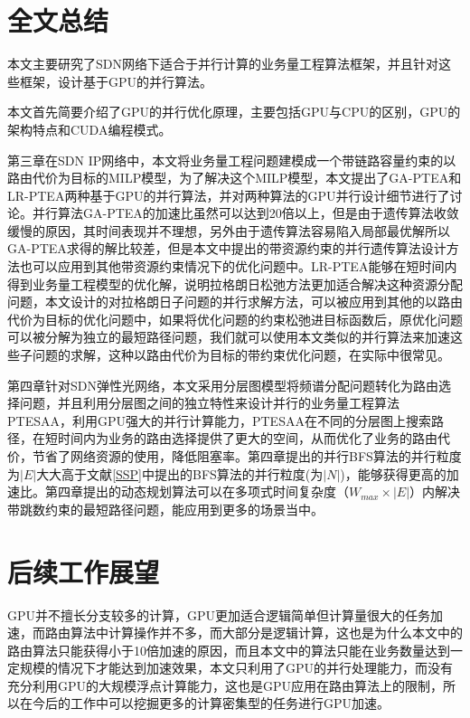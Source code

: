 \documentclass[master]{thesis-uestc}
\begin{document}
\section{全文总结}
本文主要研究了SDN网络下适合于并行计算的业务量工程算法框架，并且针对这些框架，设计基于GPU的并行算法。

本文首先简要介绍了GPU的并行优化原理，主要包括GPU与CPU的区别，GPU的架构特点和CUDA编程模式。

第三章在SDN IP网络中，本文将业务量工程问题建模成一个带链路容量约束的以路由代价为目标的MILP模型，为了解决这个MILP模型，本文提出了GA-PTEA和LR-PTEA两种基于GPU的并行算法，并对两种算法的GPU并行设计细节进行了讨论。并行算法GA-PTEA的加速比虽然可以达到20倍以上，但是由于遗传算法收敛缓慢的原因，其时间表现并不理想，另外由于遗传算法容易陷入局部最优解所以GA-PTEA求得的解比较差，但是本文中提出的带资源约束的并行遗传算法设计方法也可以应用到其他带资源约束情况下的优化问题中。LR-PTEA能够在短时间内得到业务量工程模型的优化解，说明拉格朗日松弛方法更加适合解决这种资源分配问题，本文设计的对拉格朗日子问题的并行求解方法，可以被应用到其他的以路由代价为目标的优化问题中，如果将优化问题的约束松弛进目标函数后，原优化问题可以被分解为独立的最短路径问题，我们就可以使用本文类似的并行算法来加速这些子问题的求解，这种以路由代价为目标的带约束优化问题，在实际中很常见。

第四章针对SDN弹性光网络，本文采用分层图模型将频谱分配问题转化为路由选择问题，并且利用分层图之间的独立特性来设计并行的业务量工程算法PTESAA，利用GPU强大的并行计算能力，PTESAA在不同的分层图上搜索路径，在短时间内为业务的路由选择提供了更大的空间，从而优化了业务的路由代价，节省了网络资源的使用，降低阻塞率。第四章提出的并行BFS算法的并行粒度为$|E|$大大高于文献\ref{SSP}中提出的BFS算法的并行粒度(为$|N|$)，能够获得更高的加速比。第四章提出的动态规划算法可以在多项式时间复杂度（$W_{max}\times|E|$）内解决带跳数约束的最短路径问题，能应用到更多的场景当中。

\section{后续工作展望}
GPU并不擅长分支较多的计算，GPU更加适合逻辑简单但计算量很大的任务加速，而路由算法中计算操作并不多，而大部分是逻辑计算，这也是为什么本文中的路由算法只能获得小于10倍加速的原因，而且本文中的算法只能在业务数量达到一定规模的情况下才能达到加速效果，本文只利用了GPU的并行处理能力，而没有充分利用GPU的大规模浮点计算能力，这也是GPU应用在路由算法上的限制，所以在今后的工作中可以挖掘更多的计算密集型的任务进行GPU加速。
\end{document}
